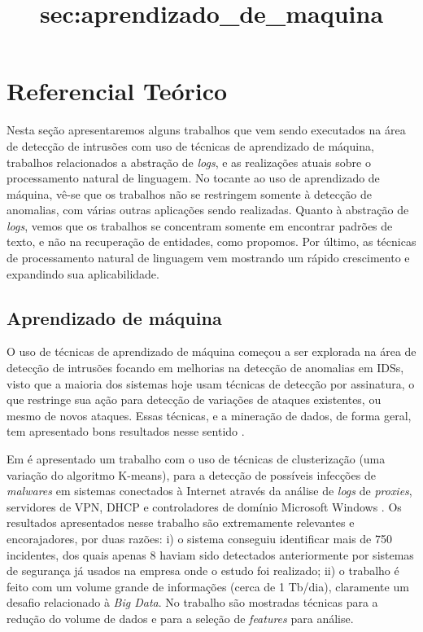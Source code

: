\documentclass[
	12pt,				%
	openright,			%
	twoside,			%
	a4paper,			%
	english,			%
	french,				%
	spanish,			%
	brazil,				%
	]{abntex2}
\begin{document}
\chapter{Referencial Teórico}\label{chap:referencial}

Nesta seção apresentaremos alguns trabalhos que vem sendo executados na área de detecção de intrusões com uso de técnicas de aprendizado de máquina, trabalhos relacionados a abstração de \emph{logs}, e as realizações atuais sobre o processamento natural de linguagem. No tocante ao uso de aprendizado de máquina, vê-se que os trabalhos não se restringem somente à detecção de anomalias, com várias outras aplicações sendo realizadas. Quanto à abstração de \emph{logs}, vemos que os trabalhos se concentram somente em encontrar padrões de texto, e não na recuperação de entidades, como propomos. Por último, as técnicas de processamento natural de linguagem vem mostrando um rápido crescimento e expandindo sua aplicabilidade.

\section{Aprendizado de máquina}\title{sec:aprendizado_de_maquina}
O uso de técnicas de aprendizado de máquina começou a ser explorada na área de detecção de intrusões focando em melhorias na detecção de anomalias em IDSs, visto que a maioria dos sistemas hoje usam técnicas de detecção por assinatura, o que restringe sua ação para detecção de variações de ataques existentes, ou mesmo de novos ataques. Essas técnicas, e a mineração de dados, de forma geral, tem apresentado bons resultados nesse sentido \cite{dua2011data, yen2013beehive, zomlot2013aiding, ganapathy2012intelligent, li2013automatic, joseph2012machine}.

Em \cite{yen2013beehive} é apresentado um trabalho com o uso de técnicas de clusterização (uma variação do algoritmo K-means\cite{ball1967clustering}), para a detecção de possíveis infecções de \emph{malwares} em sistemas conectados à Internet através da análise de \emph{logs} de \emph{proxies}, servidores de VPN, DHCP e controladores de domínio Microsoft Windows \texttrademark. Os resultados apresentados nesse trabalho são extremamente relevantes e encorajadores, por duas razões: i) o sistema conseguiu identificar mais de 750 incidentes, dos quais apenas 8 haviam sido detectados anteriormente por sistemas de segurança já usados na empresa onde o estudo foi realizado; ii) o trabalho é feito com um volume grande de informações (cerca de 1 Tb/dia), claramente um desafio relacionado à \emph{Big Data}. No trabalho são mostradas técnicas para a redução do volume de dados e para a seleção de \emph{features} para análise.
\end{document}
